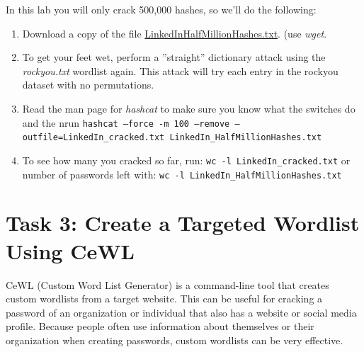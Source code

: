 \documentclass{article}
\begin{document}
In this lab you will only crack 500,000 hashes, so we'll do the following:
\begin{enumerate}
\item Download a copy of the file \href{https://raw.githubusercontent.com/deargle/security-assignments/master/labs/files/LinkedIn\_HalfMillionHashes.txt}{LinkedInHalfMillionHashes.txt}. (use \textit{wget}.
\item To get your feet wet, perform a ''straight'' dictionary attack using the \textit{rockyou.txt} wordlist again. This attack will try each entry in the rockyou dataset with no permutations.
\item Read the man page for \textit{hashcat} to make sure you know what the switches do and the nrun \texttt{hashcat --force -m 100 --remove --outfile=LinkedIn\_cracked.txt LinkedIn\_HalfMillionHashes.txt}
\item To see how many you cracked so far, run: \texttt{wc -l LinkedIn\_cracked.txt} or number of passwords left with: \texttt{wc -l LinkedIn\_HalfMillionHashes.txt}
\end{enumerate}

\section{Task 3: Create a Targeted Wordlist Using CeWL}
CeWL (Custom Word List Generator) is a command-line tool that creates custom wordlists from a target website. This can be useful for cracking a password of an organization or individual that also has a website or social media profile. Because people often use information about themselves or their organization when creating passwords, custom wordlists can be very effective.
\end{document}
